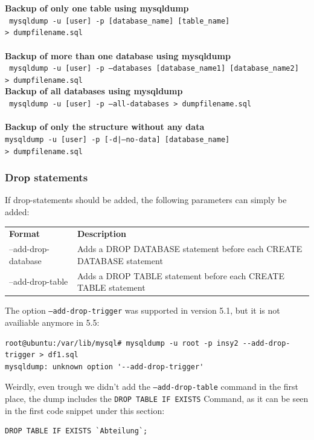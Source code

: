\documentclass[10pt]{article}
\begin{document}
\textbf{Backup of only one table using mysqldump}\\
\texttt{ mysqldump -u  [user] -p [database\_name] [table\_name] \textgreater ~dumpfilename.sql } \\ \\
\textbf{Backup of more than one database using mysqldump}\\
\texttt{ mysqldump -u  [user] -p --databases [database\_name1] [database\_name2] \textgreater ~dumpfilename.sql } \\ 
\textbf{Backup of all databases using mysqldump}\\
\texttt{ mysqldump -u  [user] -p --all-databases \textgreater ~dumpfilename.sql } \\ \\
\textbf{Backup of only the structure without any data}\\
\texttt{mysqldump -u  [user] -p [-d|--no-data] [database\_name] \textgreater ~dumpfilename.sql }
\subsubsection{Drop statements}
If drop-statements should be added, the following parameters can simply be added:
\begin{table}[h]
\begin{tabular}{ll}
\textbf{Format}     & \textbf{Description}                                                \\
--add-drop-database & Adds a DROP DATABASE statement before each CREATE DATABASE statement \\
--add-drop-table    & Adds a DROP TABLE statement before each CREATE TABLE statement       \\
\end{tabular}
\end{table} \cite{mysqldumpman}
The option \texttt{--add-drop-trigger} was supported in version 5.1, but it is not availiable anymore in 5.5:  
\begin{lstlisting}    
root@ubuntu:/var/lib/mysql# mysqldump -u root -p insy2 --add-drop-trigger > df1.sql
mysqldump: unknown option '--add-drop-trigger' 
\end{lstlisting}    
Weirdly, even trough we didn't add the \texttt{--add-drop-table} command in the first place, the dump includes the 
\texttt{DROP TABLE IF EXISTS} Command, as it can be seen in the first code snippet under this section:
\begin{lstlisting}    
DROP TABLE IF EXISTS `Abteilung`;
\end{lstlisting}    
\end{document}
